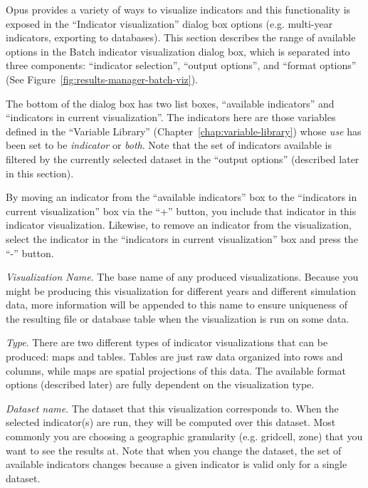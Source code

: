 Opus provides a variety of ways to visualize indicators and this
functionality is exposed in the ``Indicator visualization'' dialog
box options (e.g. multi-year indicators, exporting to
databases). This section describes the range
of available options in the Batch indicator visualization dialog
box, which is separated into three components:  ``indicator
selection'',  ``output options'', and  ``format options'' (See
Figure~\ref{fig:results-manager-batch-viz}). 


The bottom of the dialog box has two list boxes,  ``available
indicators'' and  ``indicators in current visualization''. The
indicators here are those variables defined in the 
``Variable Library'' (Chapter~\ref{chap:variable-library}) whose
\emph{use} has been set to be \emph{indicator} or \emph{both}. Note that the set of
indicators available is filtered by the currently selected dataset in
the  ``output options'' (described later in this section).

By moving an indicator from the  ``available indicators'' box to the
 ``indicators in current visualization'' box via the  ``+'' button, you
include that indicator in this indicator visualization. Likewise, to
remove an indicator from the visualization, select the indicator in
the  ``indicators in current visualization'' box and press the  ``-''
button.



\emph{Visualization Name}. The base name of any produced
visualizations. Because you might be producing this visualization for
different years and different simulation data, more information will
be appended to this name to ensure uniqueness of the resulting file
or database table when the visualization is run on some data. 

\emph{Type}. There are two different types of indicator
visualizations that can be produced: maps and tables. Tables are just
raw data organized into rows and columns, while maps are
spatial projections of this data. The available format options
(described later) are fully dependent on the visualization type. 

\emph{Dataset name}. The dataset that this visualization corresponds
to. When the selected indicator(s) are run, they will be computed over
this dataset. Most commonly you are choosing a geographic granularity
(e.g. gridcell, zone) that you want to see the results at. Note that
when you change the dataset, the set of available indicators changes
because a given indicator is valid only for a single dataset.

